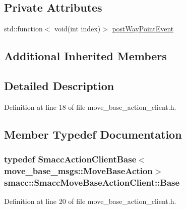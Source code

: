\subsection*{Private Attributes}
\begin{DoxyCompactItemize}
\item 
std\+::function$<$ void(int index)$>$ \hyperlink{classsmacc_1_1SmaccMoveBaseActionClient_a55a31bf13bb695a8bf5995000658d010}{post\+Way\+Point\+Event}
\end{DoxyCompactItemize}
\subsection*{Additional Inherited Members}


\subsection{Detailed Description}


Definition at line 18 of file move\+\_\+base\+\_\+action\+\_\+client.\+h.



\subsection{Member Typedef Documentation}
\subsubsection[{\texorpdfstring{Base}{Base}}]{\setlength{\rightskip}{0pt plus 5cm}typedef {\bf Smacc\+Action\+Client\+Base}$<$move\+\_\+base\+\_\+msgs\+::\+Move\+Base\+Action$>$ {\bf smacc\+::\+Smacc\+Move\+Base\+Action\+Client\+::\+Base}\hspace{0.3cm}{\ttfamily [private]}}\hypertarget{classsmacc_1_1SmaccMoveBaseActionClient_ad64340f7f8ac723bdb639c2c830975a7}{}\label{classsmacc_1_1SmaccMoveBaseActionClient_ad64340f7f8ac723bdb639c2c830975a7}


Definition at line 20 of file move\+\_\+base\+\_\+action\+\_\+client.\+h.

